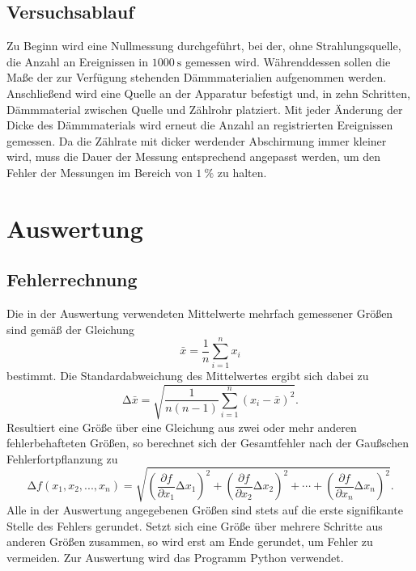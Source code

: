 \documentclass[
  bibliography=totoc,     %
  captions=tableheading,  %
  titlepage=firstiscover, %
]{scrartcl}
\begin{document}
\subsection{Versuchsablauf}
Zu Beginn wird eine Nullmessung durchgeführt, bei der, ohne Strahlungsquelle,
die Anzahl an Ereignissen in $\SI{1000}{\second}$ gemessen wird.
Währenddessen sollen die Maße der zur Verfügung stehenden Dämmmaterialien
aufgenommen werden. Anschließend wird eine Quelle an der Apparatur befestigt
und, in zehn Schritten, Dämmmaterial zwischen Quelle und Zählrohr platziert.
Mit jeder Änderung der Dicke des Dämmmaterials wird erneut die Anzahl an
registrierten Ereignissen gemessen. Da die Zählrate mit dicker werdender
Abschirmung immer kleiner wird, muss die Dauer der Messung entsprechend
angepasst werden, um den Fehler der Messungen im Bereich von $\SI{1}{\percent}$
zu halten.
\section{Auswertung}
\label{sec:auswertung}
\subsection{Fehlerrechnung}
\label{sec:fehlerrechnung}
Die in der Auswertung verwendeten Mittelwerte mehrfach gemessener Größen sind gemäß der
Gleichung
\begin{equation}
\bar{x}=\frac{1}{n}\sum_{i=1}^n x_i
\label{eqn:mittelwert}
\end{equation}
bestimmt. Die Standardabweichung des Mittelwertes ergibt sich dabei zu
\begin{equation}
\mathup{\Delta}\bar{x}=\sqrt{\frac{1}{n(n-1)}\sum_{i=1}^n\left(x_i-\bar{x}\right)^2}.
\label{eqn:standardabweichung}
\end{equation}
Resultiert eine Größe über eine Gleichung aus zwei oder mehr anderen fehlerbehafteten Größen, so
berechnet sich der Gesamtfehler nach der Gaußschen Fehlerfortpflanzung zu
\begin{equation}
\mathup{\Delta}f(x_1,x_2,...,x_n)=\sqrt{\left(\frac{\partial f}{\partial x_1}\mathup{\Delta}x_1\right)^2+\left(\frac{\partial f}{\partial x_2}\mathup{\Delta}x_2\right)^2+ \dotsb +\left(\frac{\partial f}{\partial x_n}\mathup{\Delta}x_n\right)^2}.
\label{eqn:fehlerfortpflanzung}
\end{equation}
Alle in der Auswertung angegebenen Größen sind stets auf die erste signifikante Stelle des
Fehlers gerundet. Setzt sich eine Größe über mehrere Schritte aus anderen Größen zusammen,
so wird erst am Ende gerundet, um Fehler zu vermeiden. Zur Auswertung wird das Programm
Python verwendet.
\end{document}
